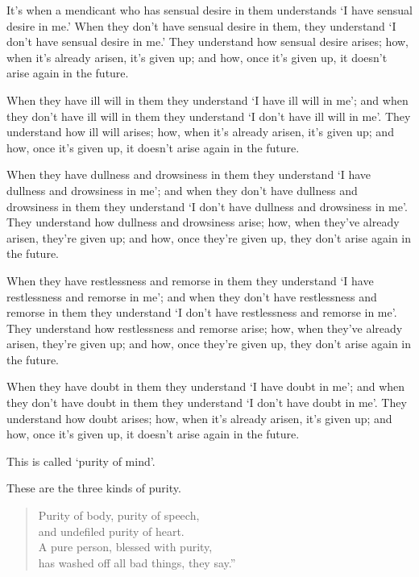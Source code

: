 \documentclass[12pt,openany]{book}%
\begin{document}
It’s when a mendicant who has sensual desire in them understands ‘I have sensual desire in me.’ When they don’t have sensual desire in them, they understand ‘I don’t have sensual desire in me.’ They understand how sensual desire arises; how, when it’s already arisen, it’s given up; and how, once it’s given up, it doesn’t arise again in the future. 

When they have ill will in them they understand ‘I have ill will in me’; and when they don’t have ill will in them they understand ‘I don’t have ill will in me’. They understand how ill will arises; how, when it’s already arisen, it’s given up; and how, once it’s given up, it doesn’t arise again in the future. 

When they have dullness and drowsiness in them they understand ‘I have dullness and drowsiness in me’; and when they don’t have dullness and drowsiness in them they understand ‘I don’t have dullness and drowsiness in me’. They understand how dullness and drowsiness arise; how, when they’ve already arisen, they’re given up; and how, once they’re given up, they don’t arise again in the future. 

When they have restlessness and remorse in them they understand ‘I have restlessness and remorse in me’; and when they don’t have restlessness and remorse in them they understand ‘I don’t have restlessness and remorse in me’. They understand how restlessness and remorse arise; how, when they’ve already arisen, they’re given up; and how, once they’re given up, they don’t arise again in the future. 

When they have doubt in them they understand ‘I have doubt in me’; and when they don’t have doubt in them they understand ‘I don’t have doubt in me’. They understand how doubt arises; how, when it’s already arisen, it’s given up; and how, once it’s given up, it doesn’t arise again in the future. 

This is called ‘purity of mind’. 

These are the three kinds of purity. 

\begin{verse}%
Purity of body, purity of speech, \\
and undefiled purity of heart. \\
A pure person, blessed with purity, \\
has washed off all bad things, they say.” 

%
\end{verse}
\end{document}

